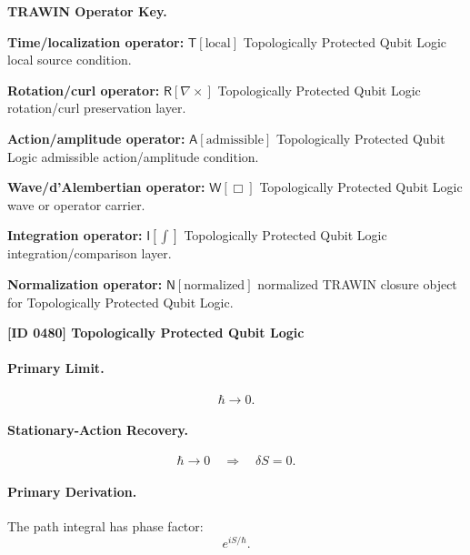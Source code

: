 \par\vspace{0.45\baselineskip}
\noindent\begin{minipage}[t]{\linewidth}
\begingroup
\small
\raggedright
\textbf{TRAWIN Operator Key.}\par
\noindent\textbf{Time/localization operator:} $\mathsf{T}\!\left[\mathrm{local}\right]$ Topologically Protected Qubit Logic local source condition.\par
\noindent\textbf{Rotation/curl operator:} $\mathsf{R}\!\left[\nabla\times\right]$ Topologically Protected Qubit Logic rotation/curl preservation layer.\par
\noindent\textbf{Action/amplitude operator:} $\mathsf{A}\!\left[\mathrm{admissible}\right]$ Topologically Protected Qubit Logic admissible action/amplitude condition.\par
\noindent\textbf{Wave/d'Alembertian operator:} $\mathsf{W}\!\left[\Box\right]$ Topologically Protected Qubit Logic wave or operator carrier.\par
\noindent\textbf{Integration operator:} $\mathsf{I}\!\left[\int\right]$ Topologically Protected Qubit Logic integration/comparison layer.\par
\noindent\textbf{Normalization operator:} $\mathsf{N}\!\left[\mathrm{normalized}\right]$ normalized TRAWIN closure object for Topologically Protected Qubit Logic.\par
\endgroup
\end{minipage}

\clearpage
\noindent\textbf{[ID 0480] Topologically Protected Qubit Logic}\par
\vspace{0.35em}
\paragraph{Primary Limit.}
\begin{equation}
\hbar\rightarrow 0 .
\end{equation}

\paragraph{Stationary-Action Recovery.}
\begin{equation}
\hbar\rightarrow 0
\quad\Longrightarrow\quad
\delta S=0 .
\end{equation}

\paragraph{Primary Derivation.}
The path integral has phase factor:
\begin{equation}
e^{iS/\hbar}.
\end{equation}

